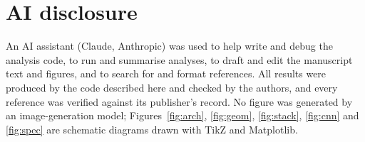 \documentclass[twocolumn,linenumbers,anonymous]{aastex702}
\begin{document}

\section*{AI disclosure}
An AI assistant (Claude, Anthropic) was used to help write and debug the analysis code, to run and summarise analyses, to draft and edit the manuscript text and figures, and to search for and format references. All results were produced by the code described here and checked by the authors, and every reference was verified against its publisher's record. No figure was generated by an image-generation model; Figures~\ref{fig:arch}, \ref{fig:geom}, \ref{fig:stack}, \ref{fig:cnn} and \ref{fig:spec} are schematic diagrams drawn with TikZ and Matplotlib.

\appendix
\onecolumngrid
\end{document}
